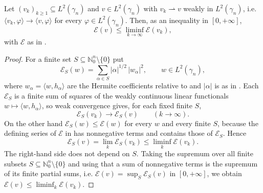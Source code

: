 \begin{lemma}
Let $(v_k)_{k\geq1} \subseteq L^2(\gamma_n)$ and $v \in L^2(\gamma_n)$ with
$v_k \rightharpoonup v$ weakly in $L^2(\gamma_n)$, i.e.
$\langle v_k, \varphi\rangle \to \langle v, \varphi\rangle$ for every
$\varphi \in L^2(\gamma_n)$.  Then, as an inequality in $[0,+\infty]$,
\[
  \mathcal{E}(v) \leq \liminf_{k \to \infty} \mathcal{E}(v_k),
\]
with $\mathcal{E}$ as in .
\end{lemma}
\begin{proof}
For a finite set $S \subseteq \mathbb{N}_0^n \setminus \{0\}$ put
\[
  \mathcal{E}_S(w) = \sum_{\alpha \in S} |\alpha|^{1/2}\,|w_\alpha|^2 ,
  \qquad w \in L^2(\gamma_n),
\]
where $w_\alpha = \langle w, h_\alpha\rangle$ are the Hermite coefficients
relative to  and $|\alpha|$ is as in
.  Each $\mathcal{E}_S$ is a finite sum of squares of the
weakly continuous linear functionals $w \mapsto \langle w, h_\alpha\rangle$, so
weak convergence gives, for each fixed finite $S$,
\[
  \mathcal{E}_S(v_k) \longrightarrow \mathcal{E}_S(v)
  \qquad (k \to \infty).
\]
On the other hand $\mathcal{E}_S(w) \leq \mathcal{E}(w)$ for every $w$ and every
finite $S$, because the defining series of $\mathcal{E}$ in  has
nonnegative terms and contains those of $\mathcal{E}_S$.  Hence
\[
  \mathcal{E}_S(v) = \lim_{k} \mathcal{E}_S(v_k)
    \leq \liminf_{k} \mathcal{E}(v_k) .
\]
The right-hand side does not depend on $S$.  Taking the supremum over all finite
subsets $S \subseteq \mathbb{N}_0^n\setminus\{0\}$ and using that a sum of
nonnegative terms is the supremum of its finite partial sums, i.e.
$\mathcal{E}(v) = \sup_S \mathcal{E}_S(v)$ in $[0,+\infty]$, we obtain
$\mathcal{E}(v) \leq \liminf_k \mathcal{E}(v_k)$.
\end{proof}

